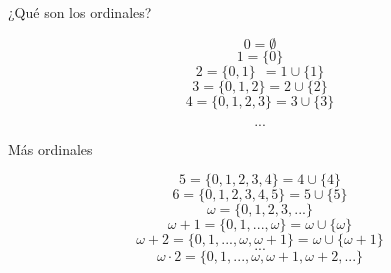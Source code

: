 \documentclass[10pt,spanish]{beamer}
\def\key#1{\{#1\}}
\begin{document}
\begin{frame}{¿Qué son los ordinales?}


\pause


$$ 0 = \emptyset $$ \pause
$$ 1 = \key{0}$$ \pause
$$ 2 = \key{0,1}\ \ = 1 \cup \key{1} $$\pause
$$ 3 = \key{0,1,2} = 2 \cup \key{2}$$
$$ 4 = \key{0,1,2,3} = 3 \cup \key{3}$$

$$...$$


\end{frame}

\begin{frame}{Más ordinales}

$$5 = \key{0,1,2,3,4} = 4 \cup \key{4}$$
$$6 = \key{0,1,2,3,4,5} = 5 \cup \key{5}$$ \pause
$$\omega = \key{0,1,2,3,...}$$ \pause
$$\omega + 1 = \key{0,1,...,\omega} = \omega \cup \key{\omega}$$
$$\omega + 2 = \key{0,1,...,\omega, \omega+1} = \omega \cup \key{\omega+1}$$
$$...$$ \pause
$$\omega \cdot 2 = \key{0,1,...,\omega, \omega+1, \omega+2,...}$$
\end{frame}
\end{document}
